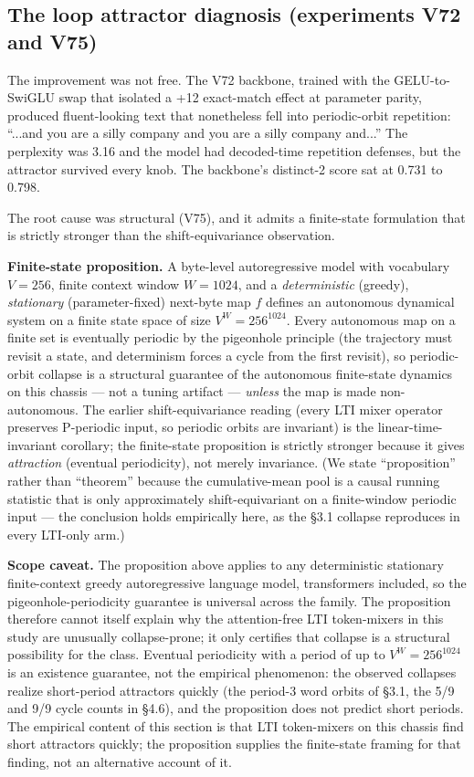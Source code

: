 \documentclass[11pt]{article}
\begin{document}
\subsection{The loop attractor diagnosis (experiments V72 and V75)}

The improvement was not free. The V72 backbone, trained with the GELU-to-SwiGLU swap that isolated a +12 exact-match effect at parameter parity, produced fluent-looking text that nonetheless fell into periodic-orbit repetition: ``...and you are a silly company and you are a silly company and...'' The perplexity was 3.16 and the model had decoded-time repetition defenses, but the attractor survived every knob. The backbone's distinct-2 score sat at 0.731 to 0.798.

The root cause was structural (V75), and it admits a finite-state formulation that is strictly stronger than the shift-equivariance observation.

\textbf{Finite-state proposition.} A byte-level autoregressive model with vocabulary $V=256$, finite context window $W=1024$, and a \emph{deterministic} (greedy), \emph{stationary} (parameter-fixed) next-byte map $f$ defines an autonomous dynamical system on a finite state space of size $V^W = 256^{1024}$. Every autonomous map on a finite set is eventually periodic by the pigeonhole principle (the trajectory must revisit a state, and determinism forces a cycle from the first revisit), so periodic-orbit collapse is a structural guarantee of the autonomous finite-state dynamics on this chassis --- not a tuning artifact --- \emph{unless} the map is made non-autonomous. The earlier shift-equivariance reading (every LTI mixer operator preserves P-periodic input, so periodic orbits are invariant) is the linear-time-invariant corollary; the finite-state proposition is strictly stronger because it gives \emph{attraction} (eventual periodicity), not merely invariance. (We state ``proposition'' rather than ``theorem'' because the cumulative-mean pool is a causal running statistic that is only approximately shift-equivariant on a finite-window periodic input --- the conclusion holds empirically here, as the \S3.1 collapse reproduces in every LTI-only arm.)

\textbf{Scope caveat.} The proposition above applies to any deterministic stationary finite-context greedy autoregressive language model, transformers included, so the pigeonhole-periodicity guarantee is universal across the family. The proposition therefore cannot itself explain why the attention-free LTI token-mixers in this study are unusually collapse-prone; it only certifies that collapse is a structural possibility for the class. Eventual periodicity with a period of up to $V^W = 256^{1024}$ is an existence guarantee, not the empirical phenomenon: the observed collapses realize short-period attractors quickly (the period-3 word orbits of \S3.1, the 5/9 and 9/9 cycle counts in \S4.6), and the proposition does not predict short periods. The empirical content of this section is that LTI token-mixers on this chassis find short attractors quickly; the proposition supplies the finite-state framing for that finding, not an alternative account of it.
\end{document}
